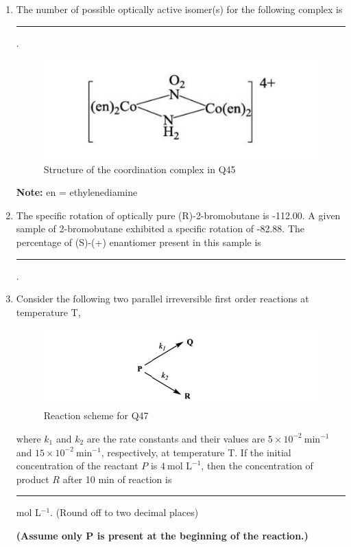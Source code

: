 \documentclass[journal,12pt,onecolumn]{IEEEtran}
\theoremstyle{remark}
\begin{document}
\begin{enumerate}
\item The number of possible optically active isomer(s) for the following complex is \rule{2cm}{0.15mm}. \hfill{}

\begin{figure}[H]
    \centering
    \includegraphics[width=0.5\linewidth]{figs/image21.png}
    \caption{Structure of the coordination complex in Q45}
    \label{fig:q45}
\end{figure}

\textbf{Note:} en = ethylenediamine

\item The specific rotation of optically pure (R)-2-bromobutane is -112.00. A given sample of 2-bromobutane exhibited a specific rotation of -82.88. The percentage of (S)-(+) enantiomer present in this sample is \rule{2cm}{0.15mm}. \hfill{}

\item Consider the following two parallel irreversible first order reactions at temperature T, \hfill{}

\begin{figure}[H]
    \centering
    \includegraphics[width=0.35\linewidth]{figs/image22.png}
    \caption{Reaction scheme for Q47}
    \label{fig:q47}
\end{figure}

\noindent where \(k_1\) and \(k_2\) are the rate constants and their values are \(5 \times 10^{-2}~\text{min}^{-1}\) and \(15 \times 10^{-2}~\text{min}^{-1}\), respectively, at temperature T. If the initial concentration of the reactant \(P\) is \(4~\text{mol L}^{-1}\), then the concentration of product \(R\) after 10 min of reaction is \rule{2cm}{0.15mm} mol L\(^{-1}\). (Round off to two decimal places)

\textbf{(Assume only P is present at the beginning of the reaction.)}


\end{enumerate}
\end{document}
